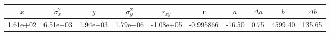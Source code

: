 \begin{tabular}{cccccccccc}
\toprule
$\overline{x}$ & $\sigma_x^2$ & $\overline{y}$ & $\sigma_y^2$ & $r_{xy}$ & r & $a$ & $\Delta a$ & $b$ & $\Delta b$ \\
\midrule
1.61e+02 & 6.51e+03 & 1.94e+03 & 1.79e+06 & -1.08e+05 & -0.995866 & -16.50 & 0.75 & 4599.40 & 135.65 \\
\bottomrule
\end{tabular}
